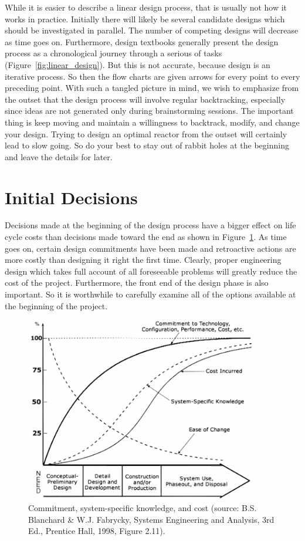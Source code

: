 While it is easier to describe a linear design process, that is usually not how it works in practice. Initially there will likely be several candidate designs which should be investigated in parallel. The number of competing designs will decrease as time goes on. 
Furthermore, design textbooks generally present the design process as a chronological journey through a serious of tasks (Figure~\ref{fig:linear_design}). But this is not accurate, because design is an iterative process. So then the flow charts are given arrows for every point to every preceding point. 
With such a tangled picture in mind, we wish to emphasize from the outset that the design process will involve regular backtracking, especially since ideas are not generated only during brainstorming sessions.
The important thing is keep moving and maintain a willingness to backtrack, modify, and change your design. Trying to design an optimal reactor from the outset will certainly lead to slow going. So do your best to stay out of rabbit holes at the beginning and leave the details for later.

\section{Initial Decisions}
Decisions made at the beginning of the design process have a bigger effect on life cycle costs than decisions made toward the end as shown in Figure~\ref{fig:life_cycle_cost}. 
As time goes on, certain design commitments have been made and retroactive actions are more costly than designing it right the first time.
Clearly, proper engineering design which takes full account of all foreseeable problems will greatly reduce the cost of the project.
Furthermore, the front end of the design phase is also important. So it is worthwhile to carefully examine all of the options available at the beginning of the project. 

\begin{figure}
  \label{fig:life_cycle_cost}
  \centering
  \includegraphics[width=0.90\textwidth]{graphics/life_cycle_cost_chart.png}
  \caption{Commitment, system-specific knowledge, and cost (source: B.S. Blanchard \& W.J. Fabrycky, Systems Engineering and Analysis, 3rd Ed., Prentice Hall, 1998, Figure 2.11).}
\end{figure}

